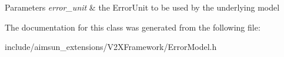 \begin{DoxyParams}{Parameters}
{\em error\+\_\+unit} & the Error\+Unit to be used by the underlying model \\
\hline
\end{DoxyParams}


The documentation for this class was generated from the following file\+:\begin{DoxyCompactItemize}
\item 
include/aimsun\+\_\+extensions/\+V2\+X\+Framework/Error\+Model.\+h\end{DoxyCompactItemize}
